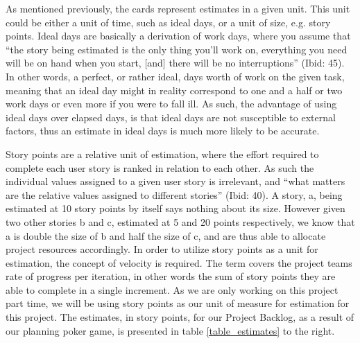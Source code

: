 As mentioned previously, the cards represent estimates in a given unit. This unit could be either a unit of time, such as ideal days, or a unit of size, e.g. story points. Ideal days are basically a derivation of work days, where you assume that “the story being estimated is the only thing you’ll work on, everything you need will be on hand when you start, [and] there will be no interruptions” (Ibid: 45). In other words, a perfect, or rather ideal, days worth of work on the given task, meaning that an ideal day might in reality correspond to one and a half or two work days or even more if you were to fall ill. As such, the advantage of using ideal days over elapsed days, is that ideal days are not susceptible to external factors, thus an estimate in ideal days is much more likely to be accurate.

Story points are a relative unit of estimation, where the effort required to complete each user story is ranked in relation to each other. As such the individual values assigned to a given user story is irrelevant, and “what matters are the relative values assigned to different stories” (Ibid: 40). A story, a,  being estimated at 10 story points by itself says nothing about its size. However given two other stories b and c, estimated at 5 and 20 points respectively, we know that a is double the size of b and half the size of c, and are thus able to allocate project resources accordingly. In order to utilize story points as a unit for estimation, the concept of velocity is required. The term covers the project teams rate of progress per iteration, in other words the sum of story points they are able to complete in a single increment. As we are only working on this project part time, we will be using story points as our unit of measure for estimation for this project. The estimates, in story points, for our Project Backlog, as a result of our planning poker game, is presented in table \ref{table_estimates} to the right.


\pagebreak

